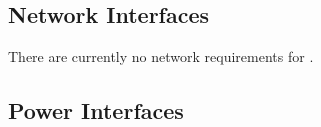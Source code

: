 \subsection{Network Interfaces}
\label{loc:ExtIF_Network}
% 

There are currently no network requirements for \ThisSystem.



\KNEADSUBSECTIONNEWPAGE
\subsection{Power Interfaces}
\label{loc:ExtIF_Power}



